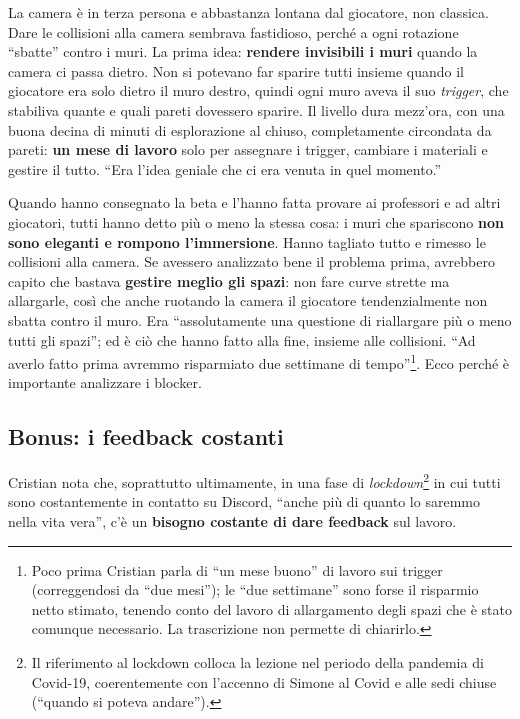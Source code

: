 La camera è in terza persona e abbastanza lontana dal giocatore, non classica.
Dare le collisioni alla camera sembrava fastidioso, perché a ogni rotazione
``sbatte'' contro i muri. La prima idea: \textbf{rendere invisibili i muri}
quando la camera ci passa dietro. Non si potevano far sparire tutti insieme
quando il giocatore era solo dietro il muro destro, quindi ogni muro aveva il
suo \emph{trigger}, che stabiliva quante e quali pareti dovessero sparire. Il
livello dura mezz'ora, con una buona decina di minuti di esplorazione al
chiuso, completamente circondata da pareti: \textbf{un mese di lavoro} solo
per assegnare i trigger, cambiare i materiali e gestire il tutto. ``Era l'idea
geniale che ci era venuta in quel momento.''

Quando hanno consegnato la beta e l'hanno fatta provare ai professori e ad altri
giocatori, tutti hanno detto più o meno la stessa cosa: i muri che spariscono
\textbf{non sono eleganti e rompono l'immersione}. Hanno tagliato tutto e
rimesso le collisioni alla camera. Se avessero analizzato bene il problema
prima, avrebbero capito che bastava \textbf{gestire meglio gli spazi}: non fare
curve strette ma allargarle, così che anche ruotando la camera il giocatore
tendenzialmente non sbatta contro il muro. Era ``assolutamente una questione di
riallargare più o meno tutti gli spazi''; ed è ciò che hanno fatto alla fine,
insieme alle collisioni. ``Ad averlo fatto prima avremmo risparmiato due
settimane di tempo''\footnote{Poco prima Cristian parla di ``un mese buono'' di
lavoro sui trigger (correggendosi da ``due mesi''); le ``due settimane'' sono
forse il risparmio netto stimato, tenendo conto del lavoro di allargamento
degli spazi che è stato comunque necessario. La trascrizione non permette di
chiarirlo.}. Ecco perché è importante analizzare i blocker.

\subsection{Bonus: i feedback costanti}

Cristian nota che, soprattutto ultimamente, in una fase di
\emph{lockdown}\footnote{Il riferimento al lockdown colloca la lezione nel
periodo della pandemia di Covid-19, coerentemente con l'accenno di Simone al
Covid e alle sedi chiuse (``quando si poteva andare'').} in cui tutti sono
costantemente in contatto su Discord, ``anche più di quanto lo saremmo nella
vita vera'', c'è un \textbf{bisogno costante di dare feedback} sul lavoro.

